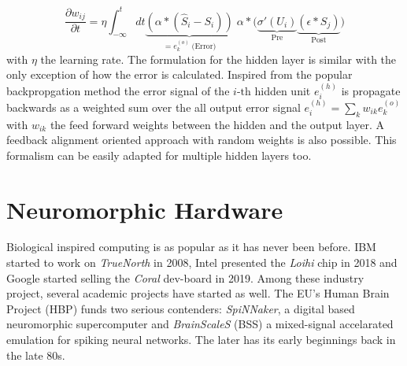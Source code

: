 \begin{equation}
\frac{\partial w_{ij}}{\partial t} = \eta \int_{-\infty}^{t} dt
\underbrace{\left(\alpha \ast (\hat{S}_i - S_i)\right)}_{= e^{(o)}_k \; \text{(Error)}} 
\; \alpha \ast 
\Big(\underbrace{\sigma'(U_i)}_{\text{Pre}} 
\underbrace{\left(\epsilon \ast S_j\right)}_{\text{Post}}\Big)
\end{equation}
with $\eta$ the learning rate. The formulation for the hidden layer is similar with the only exception of how the error is calculated. Inspired from the popular backpropgation method the error signal of the $i \text{-th}$ hidden unit $e^{(h)}_i$ is propagate backwards as a weighted sum over the all output error signal $e^{(h)}_i = \sum_{k} w_{ik} e^{(o)}_k$ with $w_{ik}$ the feed forward weights between the hidden and the output layer. A feedback alignment oriented approach with random weights is also possible. This formalism can be easily adapted for multiple hidden layers too.


%

\section{Neuromorphic Hardware}

Biological inspired computing is as popular as it has never been before. IBM started to work on \textit{TrueNorth} in 2008, Intel presented the \textit{Loihi} chip in 2018 and Google started selling the \textit{Coral} dev-board in 2019. Among these industry project, several academic projects have started as well. The EU's Human Brain Project (HBP) funds two serious contenders: \textit{SpiNNaker}, a digital based neuromorphic supercomputer and \textit{BrainScaleS} (BSS) a mixed-signal accelarated emulation for spiking neural networks. The later has its early beginnings back in the late 80s.

